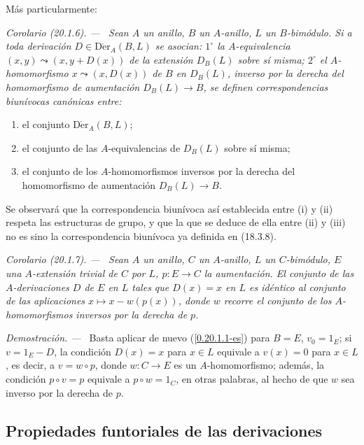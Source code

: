 \documentclass[10pt,oneside]{book}
\makeatletter
\newcommand{\sref}[1]{\textup{(\ref{#1})}}
\newcommand{\setmanualcurrentlabel}[1]{\def\@currentlabel{#1}}
\newenvironment{corollary}[1][]{%
  \setmanualcurrentlabel{#1}\par\medskip\noindent\itshape Corolario (#1). ---\ }{\par}
\newenvironment{proof}{%
  \par\medskip\noindent\textit{Demostración. ---\ }}{\par}
\providecommand{\setmin}{-}%
\makeatother
\begin{document}
Más particularmente:

\begin{corollary}[20.1.6]
\label{0.20.1.6-es}
Sean $A$ un anillo, $B$ un $A$-anillo, $L$ un $B$-bimódulo. Si a toda
derivación $D\in\operatorname{D\acute{e}r}_A(B,L)$ se asocian: $1^\circ$ la
$A$-equivalencia $(x,y)\leadsto(x,y+D(x))$ de la extensión $D_B(L)$ sobre
sí misma; $2^\circ$ el $A$-homomorfismo $x\leadsto(x,D(x))$ de $B$ en
$D_B(L)$, inverso por la derecha del homomorfismo de aumentación $D_B(L)\to B$,
se definen correspondencias biunívocas canónicas entre:
\begin{enumerate}
  \item[\rm(i)] el conjunto $\operatorname{D\acute{e}r}_A(B,L)$;
  \item[\rm(ii)] el conjunto de las $A$-equivalencias de $D_B(L)$ sobre sí misma;
  \item[\rm(iii)] el conjunto de los $A$-homomorfismos inversos por la derecha del
  homomorfismo de aumentación $D_B(L)\to B$.
\end{enumerate}
\end{corollary}

Se observará que la correspondencia biunívoca así establecida entre (i) y (ii)
respeta las estructuras de grupo, y que la que se deduce de ella entre (ii) y
(iii) no es sino la correspondencia biunívoca ya definida en (18.3.8).

\begin{corollary}[20.1.7]
\label{0.20.1.7-es}
Sean $A$ un anillo, $C$ un $A$-anillo, $L$ un $C$-bimódulo, $E$ una
$A$-extensión trivial de $C$ por $L$, $p:E\to C$ la aumentación. El conjunto
de las $A$-derivaciones $D$ de $E$ en $L$ tales que $D(x)=x$ en $L$ es
idéntico al conjunto de las aplicaciones $x\mapsto x\setmin w(p(x))$, donde $w$
recorre el conjunto de los $A$-homomorfismos inversos por la derecha de $p$.
\end{corollary}

\begin{proof}
Basta aplicar de nuevo \sref{0.20.1.1-es} para $B=E$,
$v_0=1_E$; si $v=1_E\setmin D$, la condición $D(x)=x$ para
$x\in L$ equivale a $v(x)=0$ para $x\in L$, es decir, a $v=w\circ p$,
donde $w:C\to E$ es un $A$-homomorfismo; además, la condición
$p\circ v=p$ equivale a $p\circ w=1_C$, en otras palabras, al hecho de
que $w$ sea inverso por la derecha de $p$.
\end{proof}

\subsection{Propiedades funtoriales de las derivaciones}
\label{subsection:0.20.2-es}
\end{document}
